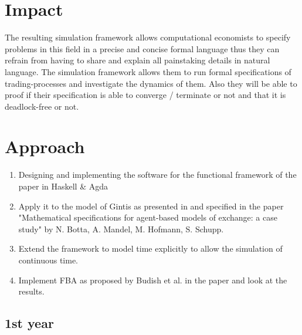 \documentclass{article}
\begin{document}

\section{Impact}
The resulting simulation framework allows computational economists to specify problems in this field in a precise and concise formal language thus they can refrain from having to share and explain all painstaking details in natural language. The simulation framework allows them to run formal specifications of trading-processes and investigate the dynamics of them. Also they will be able to proof if their specification is able to converge / terminate or not and that it is deadlock-free or not.



\section{Approach}

\begin{enumerate}
\item Designing and implementing the software for the functional framework of the paper \cite{Botta20114025} in Haskell \& Agda
\item Apply it to the model of Gintis as presented in \cite{Gintis2006} and specified in the paper "Mathematical specifications for agent-based
models of exchange: a case study" by N. Botta, A. Mandel, M. Hofmann, S. Schupp.
\item Extend the framework to model time explicitly to allow the simulation of continuous time.
\item Implement FBA as proposed by Budish et al. in the paper \cite{Budish2015} and look at the results.
\end{enumerate}

\subsection{1st year}
\end{document}

